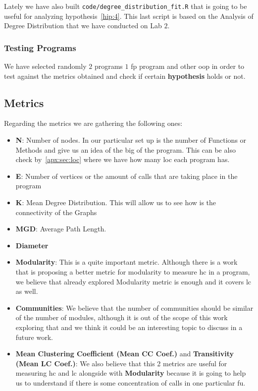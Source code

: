 \documentclass[12pt, a4paper]{article}
\begin{document}
Lately we have also built \texttt{code/degree_distribution_fit.R} that is going to be useful for analyzing hypothesis~\ref{hip:4}. This last script is based on the Analysis of Degree Distribution that
we have conducted on Lab $2$.

\subsubsection{Testing Programs}
We have selected randomly $2$ programs $1$ \acrfull{fp} program and other \acrfull{oop} in order to test against
the metrics obtained and check if certain \textbf{hypothesis} holds or not.

\subsection{Metrics}
Regarding the metrics we are gathering the following ones:

\begin{itemize}
    \item \textbf{N}: Number of nodes. In our particular set up is the number of Functions or Methods and give us an idea of the big of the program.
    This can be also check by~\ref{apx:sec:loc} where we have how many \acrlong{loc} each program has.
    \item \textbf{E}: Number of vertices or the amount of calls that are taking place in the program
    \item \textbf{K}: Mean Degree Distribution. This will allow us to see how is the connectivity of the Graphs
    \item \textbf{MGD}: Average Path Length. 
    \item \textbf{Diameter}
    \item \textbf{Modularity}: This is a quite important metric. Although there is a work~\cite{paper_cohesion} that is proposing a better metric for modularity
     to measure \acrlong{hc} in a program, we believe that already explored Modularity metric is enough and it covers \acrlong{lc} as well.
    \item \textbf{Communities}: We believe that the number of communities should be similar of the number of modules, although it is out of the scope of this work exploring that
    and we think it could be an interesting topic to discuss in a future work.
    \item \textbf{Mean Clustering Coefficient (Mean CC Coef.)} and \textbf{Transitivity (Mean LC Coef.)}: We also believe that this 2 metrics are useful for measuring \acrlong{hc} and \acrlong{lc}
    alongside with \textbf{Modularity} because it is going to help us to understand if there is some concentration of calls in one particular \acrlong{fu}.
\end{itemize}
\end{document}
